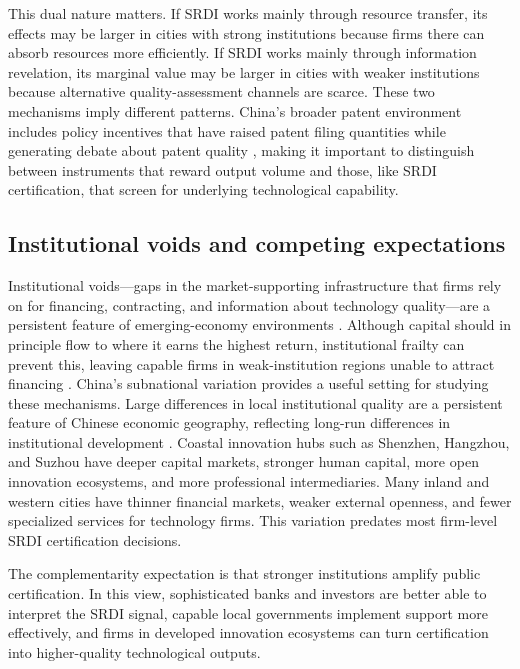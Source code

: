 \documentclass[12pt]{article}
\begin{document}
This dual nature matters. If SRDI works mainly through resource transfer, its effects may be larger in cities with strong institutions because firms there can absorb resources more efficiently. If SRDI works mainly through information revelation, its marginal value may be larger in cities with weaker institutions because alternative quality-assessment channels are scarce. These two mechanisms imply different patterns. China's broader patent environment includes policy incentives that have raised patent filing quantities while generating debate about patent quality \citep{hu2017,lin2021}, making it important to distinguish between instruments that reward output volume and those, like SRDI certification, that screen for underlying technological capability.

\subsection{Institutional voids and competing expectations}

Institutional voids---gaps in the market-supporting infrastructure that firms rely on for financing, contracting, and information about technology quality---are a persistent feature of emerging-economy environments \citep{north1990,khanna1997,mair2009}. Although capital should in principle flow to where it earns the highest return, institutional frailty can prevent this, leaving capable firms in weak-institution regions unable to attract financing \citep{lucas1990}. China's subnational variation provides a useful setting for studying these mechanisms. Large differences in local institutional quality are a persistent feature of Chinese economic geography, reflecting long-run differences in institutional development \citep{north1990,acemoglu2001}. Coastal innovation hubs such as Shenzhen, Hangzhou, and Suzhou have deeper capital markets, stronger human capital, more open innovation ecosystems, and more professional intermediaries. Many inland and western cities have thinner financial markets, weaker external openness, and fewer specialized services for technology firms. This variation predates most firm-level SRDI certification decisions.

The complementarity expectation is that stronger institutions amplify public certification. In this view, sophisticated banks and investors are better able to interpret the SRDI signal, capable local governments implement support more effectively, and firms in developed innovation ecosystems can turn certification into higher-quality technological outputs.
\end{document}
